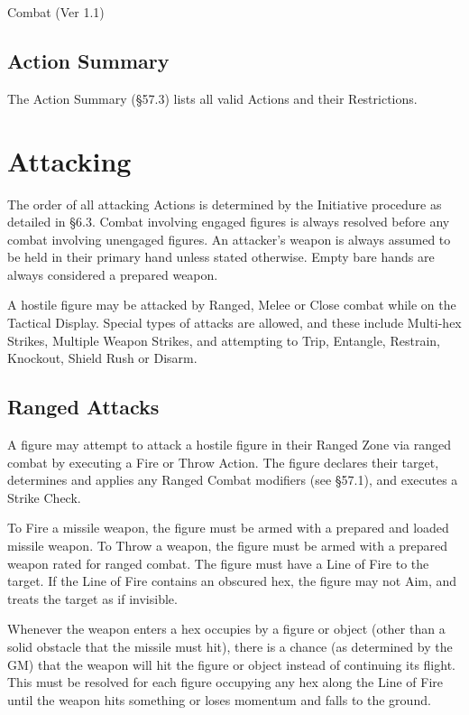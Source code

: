 \begin{Chapter}{Combat (Ver 1.1)}
\subsection{Action Summary}

The Action Summary (§57.3) lists all valid Actions and their
Restrictions.

\section{Attacking}

The order of all attacking Actions is determined by the Initiative
procedure as detailed in §6.3. Combat involving engaged figures is
always resolved before any combat involving unengaged figures.  An
attacker’s weapon is always assumed to be held in their primary hand
unless stated otherwise.  Empty bare hands are always considered a
prepared weapon.

A hostile figure may be attacked by Ranged, Melee or Close combat
while on the Tactical Display.  Special types of attacks are allowed,
and these include Multi-hex Strikes, Multiple Weapon Strikes, and
attempting to Trip, Entangle, Restrain, Knockout, Shield Rush or
Disarm.

\subsection{Ranged Attacks}

A figure may attempt to attack a hostile figure in their Ranged Zone
via ranged combat by executing a Fire or Throw Action.  The figure
declares their target, determines and applies any Ranged Combat
modifiers (see §57.1), and executes a Strike Check.

To Fire a missile weapon, the figure must be armed with a prepared and
loaded missile weapon.  To Throw a weapon, the figure must be armed
with a prepared weapon rated for ranged combat.  The figure must have
a Line of Fire to the target. If the Line of Fire contains an obscured
hex, the figure may not Aim, and treats the target as if invisible.

Whenever the weapon enters a hex occupies by a figure or object (other
than a solid obstacle that the missile must hit), there is a chance
(as determined by the GM) that the weapon will hit the figure or
object instead of continuing its flight. This must be resolved for
each figure occupying any hex along the Line of Fire until the weapon
hits something or loses momentum and falls to the ground.


\end{Chapter}
